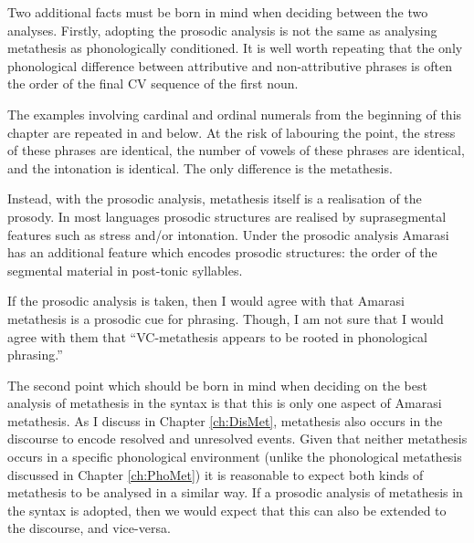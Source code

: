 Two additional facts must be born in mind
when deciding between the two analyses.
Firstly, adopting the prosodic analysis
is not the same as analysing metathesis as phonologically conditioned.
It is well worth repeating that the only phonological difference between
attributive and non-attributive phrases is often
the order of the final CV sequence of the first noun.

The examples involving cardinal and ordinal numerals
from the beginning of this chapter are repeated
in  and  below.
At the risk of labouring the point,
the stress of these phrases are identical,
the number of vowels of these phrases are identical,
and the intonation is identical.
The only difference is the metathesis.

\begin{multicols}{2}
	\begin{exe}
	\let\eachwordone=\textnormal
	\let\eachwordtwo=\itshape
		\label{ex:NenoMeseq3}
		\label{ex:NeonMeseq3}
	\end{exe}
\end{multicols}

Instead, with the prosodic analysis, metathesis
itself is a realisation of the prosody.
In most languages prosodic structures
are realised by suprasegmental features such as stress and/or intonation.
Under the prosodic analysis Amarasi has an additional
feature which encodes prosodic structures:
the order of the segmental material in post-tonic syllables.

If the prosodic analysis is taken, then I would agree with
\cite{hika} that Amarasi metathesis is a prosodic cue for phrasing.
Though, I am not sure that I would agree with them that
``VC-metathesis appears to be rooted in phonological phrasing.''

The second point which should be born in mind
when deciding on the best analysis of metathesis in the syntax
is that this is only one aspect of Amarasi metathesis.
As I discuss in Chapter \ref{ch:DisMet}, metathesis also
occurs in the discourse to encode resolved and unresolved events.
Given that neither metathesis occurs in a specific phonological environment
(unlike the phonological metathesis discussed in Chapter \ref{ch:PhoMet})
it is reasonable to expect both kinds of metathesis to be analysed in a similar way.
If a prosodic analysis of metathesis in the syntax is adopted,
then we would expect that this can also be extended to the discourse,
and vice-versa.

